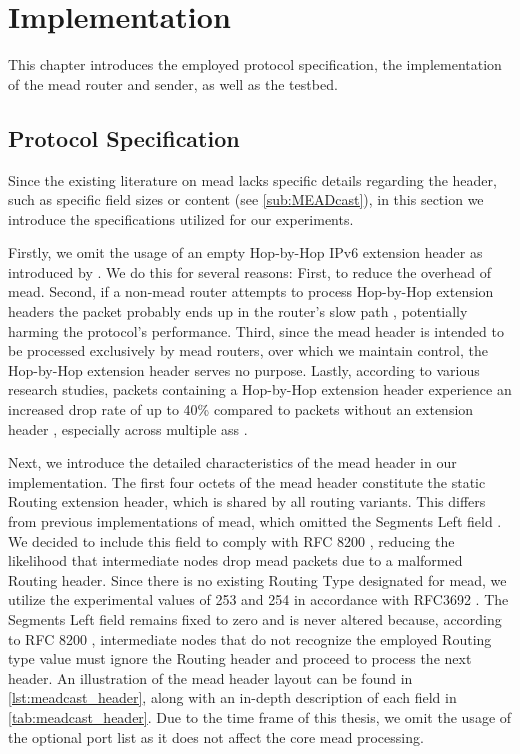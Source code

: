 \chapter{Implementation} %
\label{chap:Implementation}
This chapter introduces the employed protocol specification, the implementation
    of the \gls{mead} router and sender, as well as the testbed.

\section{Protocol Specification} %
\label{sec:Protocol Specification}
Since the existing literature on \gls{mead} \cite{meadcast1,meadcast2} lacks
    specific details regarding the header, such as specific field sizes or
    content (see \autoref{sub:MEADcast}), in this section we introduce the
    specifications utilized for our experiments.

Firstly, we omit the usage of an empty Hop-by-Hop IPv6 extension header as
    introduced by \citeauthor{meadcast1} \cite{meadcast1, meadcast2}.
We do this for several reasons:
First, to reduce the overhead of \gls{mead}.
Second, if a non-\gls{mead} router attempts to process Hop-by-Hop extension
    headers the packet probably ends up in the router's slow path
    \cite{rfc7045}, potentially harming the protocol's performance.
Third, since the \gls{mead} header is intended to be processed exclusively by
    \gls{mead} routers, over which we maintain control, the Hop-by-Hop
    extension header serves no purpose.
Lastly, according to various research studies, packets containing a Hop-by-Hop
    extension header experience an increased drop rate of up to 40\% compared
    to packets without an extension header \cite{rfc7872_ext_hdrs_drop_rate},
    especially across multiple \glspl{as}
    \cite{rfc9098_ext_hdrs_op_impl, rfc9288}.

Next, we introduce the detailed characteristics of the \gls{mead} header in our
    implementation.
The first four octets of the \gls{mead} header constitute the static Routing
    extension header, which is shared by all routing variants.
This differs from previous implementations of \gls{mead}, which omitted the
    Segments Left field \cite{sdn_ba}.
We decided to include this field to comply with RFC 8200
    \cite{rfc8200_ipv6_hdr}, reducing the likelihood that intermediate nodes
    drop \gls{mead} packets due to a malformed Routing header.
Since there is no existing Routing Type designated for \gls{mead}, we utilize the
    experimental values of 253 and 254 in accordance with RFC3692
    \cite{rfc3692_ipv6_rt_type}.
The Segments Left field remains fixed to zero and is never altered because,
    according to RFC 8200 \cite{rfc8200_ipv6_hdr}, intermediate nodes that do
    not recognize the employed Routing type value must ignore the Routing
    header and proceed to process the next header.
An illustration of the \gls{mead} header layout can be found in
    \autoref{lst:meadcast_header}, along with an in-depth description of each
    field in \autoref{tab:meadcast_header}.
Due to the time frame of this thesis, we omit the usage of the optional port
    list as it does not affect the core \gls{mead} processing.

